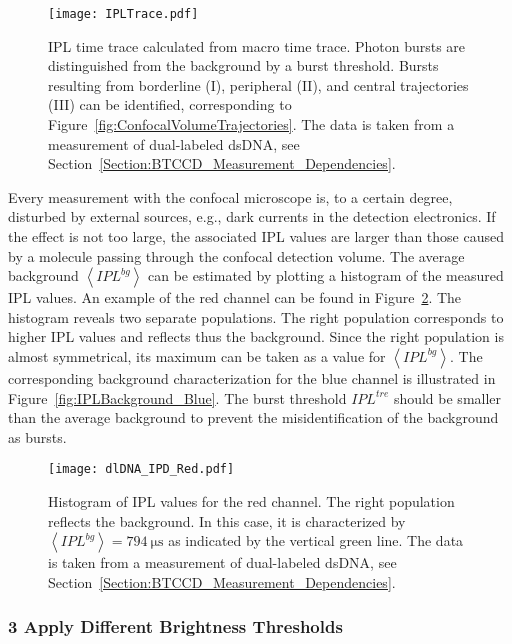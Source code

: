 \begin{figure}[h]
	\centering
	\texttt{[image: IPLTrace.pdf]}
	\caption[\gls{IPL} time trace and definition of bursts]{\gls{IPL} time trace calculated from macro time trace. Photon bursts are distinguished from the background by a burst threshold. Bursts resulting from borderline (I), peripheral (II), and central trajectories (III) can be identified, corresponding to Figure~\ref{fig:ConfocalVolumeTrajectories}. The data is taken from a measurement of dual-labeled \gls{dsDNA}, see Section~\ref{Section:BTCCD_Measurement_Dependencies}.}
	\label{fig:IPLTrace}
\end{figure}

Every measurement with the confocal microscope is, to a certain degree, disturbed by external sources, e.g., dark currents in the detection electronics. If the effect is not too large, the associated \gls{IPL} values are larger than those caused by a molecule passing through the confocal detection volume. The average background $\left\langle IPL^{bg} \right\rangle$ can be estimated by plotting a histogram of the measured \gls{IPL} values. An example of the red channel can be found in Figure~\ref{fig:IPLBackground_Red}. The histogram reveals two separate populations. The right population corresponds to higher \gls{IPL} values and reflects thus the background. Since the right population is almost symmetrical, its maximum can be taken as a value for $\left\langle IPL^{bg} \right\rangle$. The corresponding background characterization for the blue channel is illustrated in Figure~\ref{fig:IPLBackground_Blue}. The burst threshold $IPL^{tre}$ should be smaller than the average background to prevent the misidentification of the background as bursts.
\clearpage

\begin{figure}[h]
	\centering
	\texttt{[image: dlDNA\_IPD\_Red.pdf]}
	\caption[Determination of background in \gls{IPL} time trace for red channel]{Histogram of \gls{IPL} values for the red channel. The right population reflects the background. In this case, it is characterized by $\left\langle IPL^{bg} \right\rangle = \SI{794}{\micro\second}$ as indicated by the vertical green line. The data is taken from a measurement of dual-labeled \gls{dsDNA}, see Section~\ref{Section:BTCCD_Measurement_Dependencies}.}
	\label{fig:IPLBackground_Red}
\end{figure}                       

\subsubsection*{3 Apply Different Brightness Thresholds}

